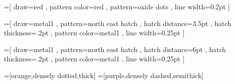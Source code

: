 =[ draw=red
                          , pattern color=red
                          , pattern=oxide dots
                          , line width=0.2pt
                          ]

=[ draw=metal1
                           , pattern=north east hatch
                           , hatch distance=3.5pt
                           , hatch thickness=.2pt
                           , pattern color=metal1
                           , line width=0.25pt
                           ] 

=[ draw=metal1
                         , pattern=north east hatch
                         , hatch distance=6pt
                         , hatch thickness=.2pt
                         , pattern color=metal1
                         , line width=0.25pt
                         ]


=[orange,densely dotted,thick]
=[purple,densely dashed,semithick]